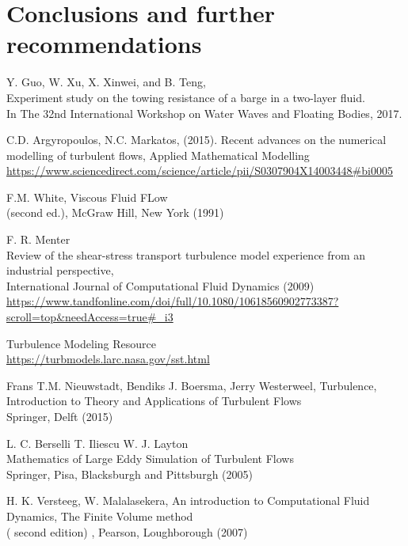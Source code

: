 \documentclass[a4paper, 12pt]{report}
\begin{document}
\chapter{Conclusions and further recommendations}

\begin{thebibliography}{9}
	Y. Guo, W. Xu, X. Xinwei, and B. Teng,\\
	Experiment study on the towing resistance of a barge in a
two-layer fluid.\\
	In The 32nd International Workshop on Water Waves and Floating Bodies, 2017.
	
	C.D. Argyropoulos, N.C. Markatos, (2015).
	Recent advances on the numerical modelling of turbulent flows, Applied Mathematical Modelling \\
	\url{https://www.sciencedirect.com/science/article/pii/S0307904X14003448#bi0005}

	F.M. White,
	Viscous Fluid FLow \\
	(second ed.), McGraw Hill, New York (1991)
	
	 F. R. Menter \\ Review of the shear-stress transport turbulence model experience from an industrial perspective,\\
	International Journal of Computational Fluid Dynamics (2009)\\
	\url{https://www.tandfonline.com/doi/full/10.1080/10618560902773387?scroll=top&needAccess=true#_i3}
	
	Turbulence Modeling Resource \\
	\url{https://turbmodels.larc.nasa.gov/sst.html}

	Frans T.M. Nieuwstadt, Bendiks J. Boersma, Jerry Westerweel,
	Turbulence, Introduction to Theory and Applications
of Turbulent Flows \\
	 Springer, Delft (2015)
	 
     L. C. Berselli T. Iliescu W. J. Layton\\	 
	 Mathematics of Large Eddy Simulation of Turbulent Flows \\
	 Springer, Pisa, Blacksburgh and Pittsburgh (2005)	 
	 
	H. K. Versteeg, W. Malalasekera, An introduction to Computational Fluid Dynamics, The Finite Volume method\\
	 ( second edition) , Pearson, Loughborough (2007)
	 

\end{thebibliography}
\end{document}
